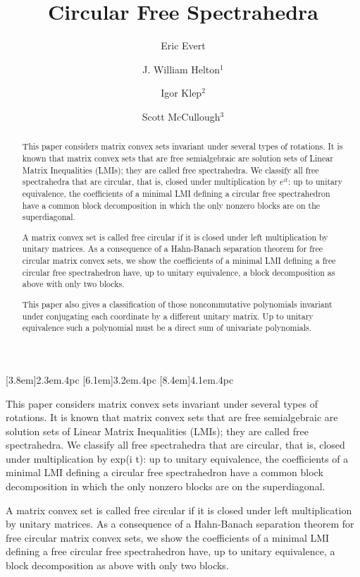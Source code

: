 \documentclass[12pt,makeidx]{amsart}
\title{Circular Free Spectrahedra}
\author[E. Evert]{Eric Evert}
\author[J.W. Helton]{J. William Helton${}^1$}
\author[I. Klep]{Igor Klep${}^{2}$}
\author[S. McCullough]{Scott McCullough${}^3$}
\numberwithin{equation}{section}
\begin{document}
\setcounter{tocdepth}{3}
\contentsmargin{2.55em} 
[3.8em]{}{2.3em}{.4pc} 
[6.1em]{}{3.2em}{.4pc}
[8.4em]{}{4.1em}{.4pc}


\begin{abstract}
This paper considers matrix convex sets   invariant under several types of rotations. 
It is known that matrix convex sets that are free semialgebraic 
are solution sets of Linear Matrix Inequalities (LMIs); they are called free spectrahedra.
We  classify all free spectrahedra that are circular, that is, closed under multiplication  by $e^{i t}$: 
up to unitary equivalence, the coefficients of a minimal LMI defining a circular free spectrahedron have a common block decomposition in which the only nonzero blocks are on the superdiagonal.

A matrix convex set is called free circular if it is closed under left multiplication by unitary matrices. 
As a consequence of 
a Hahn-Banach  separation theorem for free circular matrix convex sets,
we show  the coefficients of a minimal LMI defining a free circular free spectrahedron  have, up to unitary equivalence, a block decomposition as above  with only two
blocks. 

This paper also gives a classification of those  noncommutative polynomials invariant
 under conjugating each coordinate  by a different unitary matrix. 
Up to unitary equivalence 
such a polynomial must be a direct sum of univariate polynomials.
\end{abstract}

\iffalse
This paper considers matrix convex sets   invariant under several types of rotations. It is known that matrix convex sets that are free semialgebraic are solution sets of Linear Matrix Inequalities (LMIs); they are called free spectrahedra. We  classify all free spectrahedra that are circular, that is, closed under multiplication by exp(i t): up to unitary equivalence, the coefficients of a minimal LMI defining a circular free spectrahedron have a common block decomposition in which the only nonzero blocks are on the superdiagonal.

A matrix convex set is called free circular if it is closed under left multiplication by unitary matrices. As a consequence of a Hahn-Banach separation theorem for free circular matrix convex sets, we show  the coefficients of a minimal LMI defining a free circular free spectrahedron  have, up to unitary equivalence, a block decomposition as above  with only two blocks.
\end{document}
